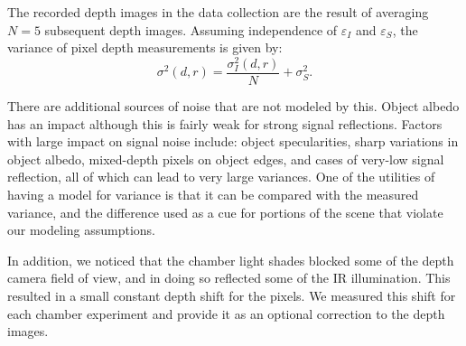 The recorded depth images in the data collection are the result of averaging $N=5$ subsequent depth images.
Assuming independence of $\varepsilon_I$ and $\varepsilon_S$, the variance of pixel depth measurements is given by:
\begin{equation}
\sigma^2(d,r) = \frac{\sigma_I^2(d,r)}{N} + \sigma_S^2.\label{eq:sigma}
\end{equation}

There are additional sources of noise that are not modeled by this.
Object albedo has an impact although this is fairly weak for strong signal reflections.
Factors with large impact on signal noise include: object specularities, sharp variations in object albedo, mixed-depth pixels on object edges, and cases of very-low signal reflection, all of which can lead to very large variances.
One of the utilities of having a model for variance is that it can be compared with the measured variance, and the difference used as a cue for portions of the scene that violate our modeling assumptions.

In addition, we noticed that the chamber light shades blocked some of the depth camera field of view, and in doing so reflected some of the IR illumination.
This resulted in a small constant depth shift for the pixels.
We measured this shift for each chamber experiment and provide it as an optional correction to the depth images.







